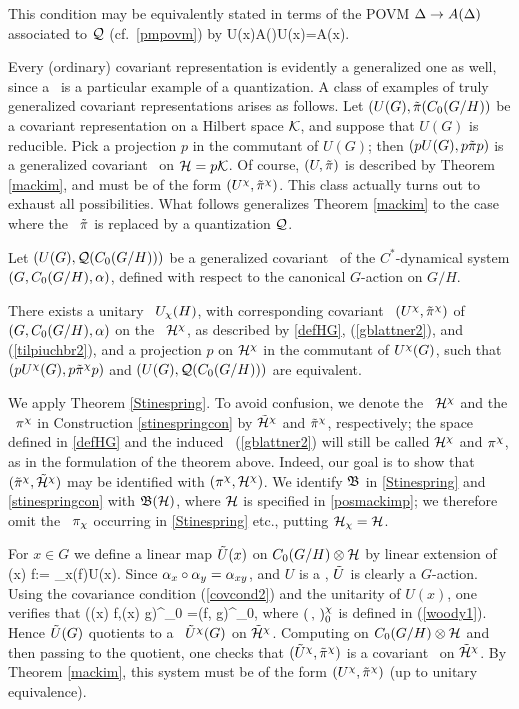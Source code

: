 This condition may be equivalently stated
in terms of the POVM $\Delta\rightarrow A(\Delta)$ associated to ${\cal Q}$
(cf.\ \ref{pmpovm}) by
\be
U(x)A(\Dl)U(x)\inv=A(x\Dl). 
\ee

Every (ordinary) covariant representation is evidently a generalized
one as well, since a \rep\ is a particular example of a quantization.
A class of examples of truly generalized  covariant representations
arises as follows.  Let $(U(G),\tilde{\pi}(C_0(G/H))$ be a
covariant representation on a Hilbert space ${\cal K}$, and suppose that
$U(G)$ is reducible. Pick a projection $p$ in the commutant of $U(G)$;
then $(pU(G),p\tilde{\pi}p)$ is a generalized covariant \rep\  on
${\cal H}=p{\cal K}$.  Of course, $(U,\tilde{\pi})$ is  described by
Theorem \ref{mackim}, and must be of the form
$(U^{\chi},\tilde{\pi}^{\chi})$. 
This class actually turns out to exhaust all possibilities.
What follows generalizes Theorem \ref{mackim}   to the case where
the \rep\ $\tilde{\pi}$ is replaced by a quantization ${\cal Q}$. 
\begin{Theorem}
Let $(U(G),{\cal Q}(C_0(G/H)))$ be a generalized 
covariant \rep\ of the $C^*$-dynamical system $(G,C_0(G/H),\alpha)$, defined
with respect to the canonical $G$-action on $G/H$.

There exists a unitary \rep\ $U_{\chi}(H)$, with corresponding
covariant \rep\ $(U^{\chi},\tilde{\pi}^{\chi})$ of $(G,C_0(G/H),\alpha)$ on
the \Hs\ ${\cal H}^{\chi}$, as described by \ref{defHG}, (\ref{gblattner2}), and
(\ref{tilpiuchbr2}), and a projection $p$ on ${\cal H}^{\chi}$ in the commutant
of $U^{\chi}(G)$, such that $(pU^{\chi}(G),p\tilde{\pi}^{\chi}p)$ and
$(U(G),{\cal Q}(C_0(G/H)))$ are equivalent.
\end{Theorem}

We apply Theorem \ref{Stinespring}. To avoid confusion, we denote
the \Hs\ ${\cal H}^{\chi}$ and the \rep\ $\pi^{\chi}$ in Construction
\ref{stinespringcon} by $\tilde{{\cal H}}^{\chi}$ and $\tilde{\pi}^{\chi}$,
respectively; the space defined in \ref{defHG} and the induced
\rep\ (\ref{gblattner2}) will still be called ${\cal H}^{\chi}$ and $\pi^{\chi}$,
as in the formulation of the theorem above. Indeed, our goal is to
show that $(\tilde{\pi}^{\chi},\tilde{{\cal H}}^{\chi})$ may be identified with
$(\pi^{\chi},{\cal H}^{\chi})$.  We identify ${\frak B}$ in \ref{Stinespring} and
\ref{stinespringcon} with ${\frak B}({\cal H})$, where ${\cal H}$ is specified in
\ref{posmackimp};  we therefore omit
the \rep\ $\pi_{\chi}$ occurring in \ref{Stinespring} etc., putting ${\cal H}_{\chi}={\cal H}$.

For $x\in G$ we define a linear map $\tilde{U}(x)$ on $C_0(G/H)\otimes {\cal H}$
by linear extension of
\be
{}(x) f\ot\Ps:= \al_x(f)\ot U(x)\Ps.
\ee
Since $\alpha_x\circ\alpha_y=\alpha_{xy}$, and $U$ is a \rep, 
$\tilde{U}$ is clearly a $G$-action. Using the covariance
condition (\ref{covcond2}) and the unitarity of $U(x)$, one verifies that
\be
((x) f\ot\Ps,(x) g\ot\Ph)^{\ch}_0 =(f\ot\Ps, g\ot\Ph)^{\ch}_0,
\ee
where $(\, , \,)^{\chi}_0$ is defined in (\ref{woody1}). Hence $\tilde{U}(G)$ quotients to a  
\rep\ $\tilde{U}^{\chi}(G)$ on  $\tilde{{\cal H}}^{\chi}$.
Computing on $C_0(G/H)\otimes {\cal H}$ and then passing to the quotient,
 one checks that
$(\tilde{U}^{\chi},\tilde{\pi}^{\chi})$ is a covariant \rep\  on 
 $\tilde{{\cal H}}^{\chi}$.
By  Theorem \ref{mackim}, this system must be of the form $(U^{\chi},\tilde{\pi}^{\chi})$
(up to unitary equivalence).

